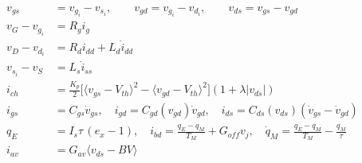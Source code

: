 \documentclass[11pt,a4paper]{article}
\begin{document}
\begin{align*}
  v_{gs}&=v_{g_i}-v_{s_i}, \qquad v_{gd}=v_{g_i}-v_{d_i}, \qquad v_{ds}=v_{gs}-v_{gd}\\
  v_G-v_{g_i}&=R_g i_g\\
  v_D-v_{d_i}&=R_d i_{dd}+L_d \dot i_{dd}\\
  v_{s_i}-v_S&=L_s \dot i_{ss}\\
  i_{ch}&=\tfrac{K_p}{2}\big[\langle v_{gs}-V_{th}\rangle^2-\langle v_{gd}-V_{th}\rangle^2\big](1+\lambda|v_{ds}|)\\
  i_{gs}&=C_{gs}\dot v_{gs}, \quad
  i_{gd}=C_{gd}(v_{gd})\dot v_{gd}, \quad
  i_{ds}=C_{ds}(v_{ds})(\dot v_{gs}-\dot v_{gd})\\
  q_E&=I_s\tau\,(e_x-1), \quad
  i_{bd}=\frac{q_E-q_M}{T_M}+G_{off}v_j, \quad
  \dot q_M=\frac{q_E-q_M}{T_M}-\frac{q_M}{\tau}\\
  i_{av}&=G_{av}\langle v_{ds}-BV\rangle
\end{align*}
\end{document}
